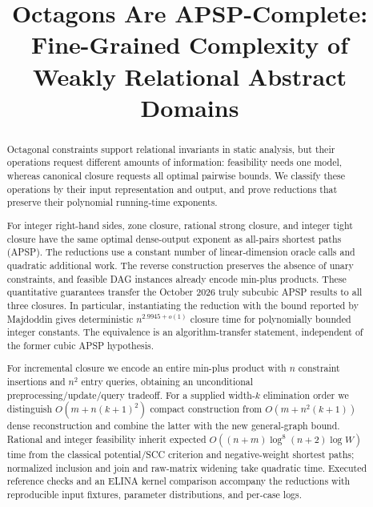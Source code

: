 \documentclass[manuscript,11pt,screen,nonacm]{acmart}
\theoremstyle{definition}
\begin{document}
\title[Octagons Are APSP-Complete]{\texorpdfstring{Octagons Are APSP-Complete:\\Fine-Grained Complexity of Weakly Relational Abstract Domains}{Octagons Are APSP-Complete: Fine-Grained Complexity of Weakly Relational Abstract Domains}}

\renewcommand{\shortauthors}{Zeng, Cao, Dai, Wang, and Ding}
\begin{abstract}
\normalsize
Octagonal constraints support relational invariants in static analysis, but their operations request different amounts of information: feasibility needs one model, whereas canonical closure requests all optimal pairwise bounds. We classify these operations by their input representation and output, and prove reductions that preserve their polynomial running-time exponents.

For integer right-hand sides, zone closure, rational strong closure, and integer tight closure have the same optimal dense-output exponent as all-pairs shortest paths (APSP). The reductions use a constant number of linear-dimension oracle calls and quadratic additional work. The reverse construction preserves the absence of unary constraints, and feasible DAG instances already encode min-plus products. These quantitative guarantees transfer the October 2026 truly subcubic APSP results to all three closures. In particular, instantiating the reduction with the bound reported by Majdoddin gives deterministic $n^{2.9945+o(1)}$ closure time for polynomially bounded integer constants. The equivalence is an algorithm-transfer statement, independent of the former cubic APSP hypothesis.

For incremental closure we encode an entire min-plus product with $n$ constraint insertions and $n^2$ entry queries, obtaining an unconditional preprocessing/update/query tradeoff. For a supplied width-$k$ elimination order we distinguish $O(m+n(k+1)^2)$ compact construction from $O(m+n^2(k+1))$ dense reconstruction and combine the latter with the new general-graph bound. Rational and integer feasibility inherit expected $O((n+m)\log^8(n+2)\log W)$ time from the classical potential/SCC criterion and negative-weight shortest paths; normalized inclusion and join and raw-matrix widening take quadratic time. Executed reference checks and an ELINA kernel comparison accompany the reductions with reproducible input fixtures, parameter distributions, and per-case logs.
\end{abstract}
\maketitle
{}
\pagestyle{plain}
\raggedbottom
{}
\thispagestyle{empty}
\clearpage
\setcounter{page}{1}
\end{document}

